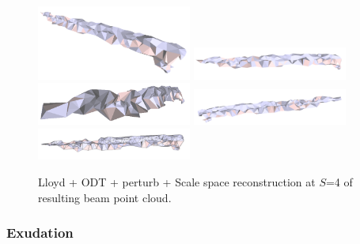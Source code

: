 \documentclass[12pt]{drexelthesis}
\let\Oldsubsubsection\subsubsection
\renewcommand{\subsubsection}{\FloatBarrier\Oldsubsubsection}
\begin{document}
\begin{figure}[!ht]
	\centering
		\includegraphics[width=2in]{real-lab-scans/meshed/optimized/scalespace4lloydodtperturb00.png}
		\includegraphics[width=2in]{real-lab-scans/meshed/optimized/scalespace4lloydodtperturb01.png}
		\includegraphics[width=2in]{real-lab-scans/meshed/optimized/scalespace4lloydodtperturb02.png}
		\includegraphics[width=2in]{real-lab-scans/meshed/optimized/scalespace4lloydodtperturb03.png}
		\includegraphics[width=2in]{real-lab-scans/meshed/optimized/scalespace4lloydodtperturb04.png}
		\caption[Lloyd + ODT + perturb + Scale space reconstruction at $S$=4 of segmented LiDAR data]{\centering Lloyd + ODT + perturb + Scale space reconstruction at $S$=4 of resulting beam point cloud.}
	\label{lidar:scalespace4lloydodtperturb}
\end{figure}

\subsubsection{Exudation}
\end{document}
